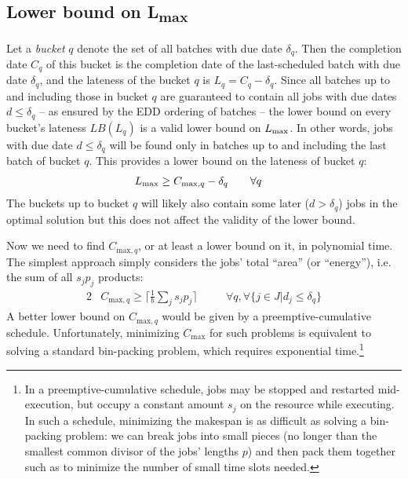 \subsection[Lower bound on $\Lmax$]{Lower bound on {\sansitalicfont L}\textsubscript{max}}
Let a \textit{bucket} $q$ denote the set of all batches with due date $\delta_q$.
Then the completion date $C_q$ of this bucket is the completion date of the
last-scheduled batch with due date $\delta_q$, and the lateness of the bucket
$q$ is $L_q = C_q - \delta_q$. Since all batches up to and including those in
bucket $q$ are guaranteed to contain all jobs with due dates $d \leq \delta_q$
-- as ensured by the EDD ordering of batches -- the lower bound on every
bucket's lateness $LB(L_q)$ is a valid lower bound on $\Lmax$. In other words,
jobs with due date $d \leq \delta_q$ will be found only in batches up to and
including the last
batch of bucket $q$. This provides a lower bound on the lateness of bucket $q$:
\begin{alignat}{2}
& L_{\text{max}} \geq C_{\text{max},q} - \delta_q \quad && \forall q
\end{alignat}
The buckets up to bucket $q$ will likely also contain some later ($d >
\delta_q$) jobs in the optimal solution but this does not affect the validity of
the lower bound.

Now we need to find $C_{\text{max},q}$, or at least a lower bound on it, in
polynomial time. The simplest approach simply considers the jobs' total ``area''
(or ``energy''), i.e. the sum of all $s_j p_j$ products:
\begin{alignat}{2}
& C_{\text{max},q} \geq \big\lceil\frac{1}{b} \sum_{j} s_j
p_j\big\rceil \quad
&& \forall q, \forall \{ j \in J | d_j \leq \delta_q \}
\end{alignat}
A better lower bound on $C_{\text{max},q}$ would be given by a
preemptive-cumulative schedule. Unfortunately, minimizing $C_{\text{max}}$ for
such problems is equivalent to solving a standard bin-packing problem, which
requires exponential time.\footnote{In a preemptive-cumulative schedule, jobs
may be stopped and restarted mid-execution, but occupy a constant amount $s_j$
on the resource while executing. In such a schedule, minimizing the makespan is
as difficult as solving a bin-packing problem: we can break jobs into small
pieces (no longer than the smallest common divisor of the jobs' lengths $p$) and
then pack them together such as to minimize the number of small time slots
needed.}

